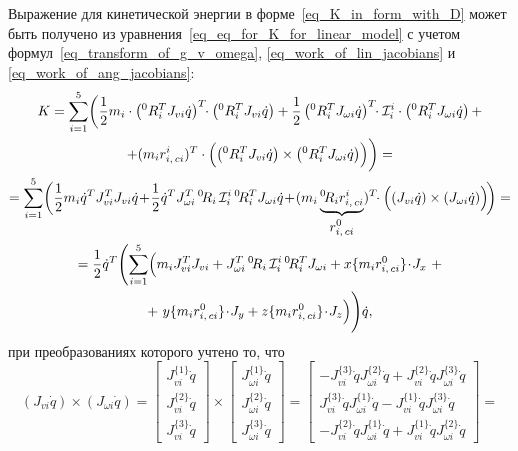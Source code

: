 Выражение для кинетической энергии в форме~\eqref{eq_K_in_form_with_D} может быть получено из уравнения~\eqref{eq_eq_for_K_for_linear_model} с учетом формул~\eqref{eq_transform_of_g_v_omega}, \eqref{eq_work_of_lin_jacobians} и \eqref{eq_work_of_ang_jacobians}:
\begin{gather}
    K = \sum_{i=1}^5 \biggl( \frac{1}{2} m_i \cdot \left( {}^0R_i^T J_{vi} \dot{q} \right)^T \!\!\cdot \left({}^0R_i^T J_{vi} \dot{q}\right) + \frac{1}{2} \left( {}^0R_i^T J_{\omega i} \dot{q} \right)^T \!\!\cdot \mathcal{I}^{i}_i \cdot \left( {}^0R_i^T J_{\omega i} \dot{q} \right) + \notag\\
    + (m_ir^i_{i,\,ci})^T \cdot \Bigl( \left( {}^0R_i^T J_{vi} \dot{q} \right) \times \left( {}^0R_i^T J_{\omega i} \dot{q} \right) \Bigr) \biggr) = \notag\\
    = \sum_{i=1}^5 \biggl(\frac{1}{2} m_i \dot{q}^T J_{vi}^T J_{vi} \dot{q} \!+\! \frac{1}{2} \dot{q}^T J_{\omega i}^T \, {}^0\!R_i \, \mathcal{I}^{i}_i \, {}^0\!R_i^T J_{\omega i} \dot{q} \!+\! (m_i \underbrace{{}^0\!R_i r^i_{i,\,ci}}_{\displaystyle r^0_{i,\,ci}})^T \!\!\cdot \Bigl( \left( J_{vi} \dot{q} \right) \times \left( J_{\omega i} \dot{q} \right) \Bigr) \!\biggr) = \notag \\
    = \frac{1}{2} \dot{q}^T \Biggl(\sum_{i=1}^5 \Bigl(m_i J_{vi}^T J_{vi} + J_{\omega i}^T \, {}^0\!R_i \, \mathcal{I}^{i}_i \, {}^0\!R_i^T J_{\omega i} + x\{ m_i r^0_{i,\,ci} \} \!\cdot\! J_{x} \,\, + \notag \\
    + \,\, y\{ m_i r^0_{i,\,ci} \} \!\cdot\! J_{y} + z\{ m_i r^0_{i,\,ci} \} \!\cdot\! J_{z}\Bigr) \Biggr) \dot{q},
\end{gather}
при преобразованиях которого учтено то, что
\begin{equation*}
    \left( J_{vi} \dot{q} \right) \times \left( J_{\omega i} \dot{q} \right) =
    \begin{bmatrix}
        J_{vi}^{\{1\}} \dot{q}\\
        J_{vi}^{\{2\}} \dot{q}\\
        J_{vi}^{\{3\}} \dot{q}
    \end{bmatrix}
    \times
    \begin{bmatrix}
        J_{\omega i}^{\{1\}} \dot{q}\\
        J_{\omega i}^{\{2\}} \dot{q}\\
        J_{\omega i}^{\{3\}} \dot{q}
    \end{bmatrix}
    =
    \begin{bmatrix}
        -J_{vi}^{\{3\}} \dot{q} J_{\omega i}^{\{2\}} \dot{q} + J_{vi}^{\{2\}} \dot{q} J_{\omega i}^{\{3\}} \dot{q}\\
         J_{vi}^{\{3\}} \dot{q} J_{\omega i}^{\{1\}} \dot{q} - J_{vi}^{\{1\}} \dot{q} J_{\omega i}^{\{3\}} \dot{q}\\
        -J_{vi}^{\{2\}} \dot{q} J_{\omega i}^{\{1\}} \dot{q} + J_{vi}^{\{1\}} \dot{q} J_{\omega i}^{\{2\}} \dot{q}
    \end{bmatrix}
    =
\end{equation*}
